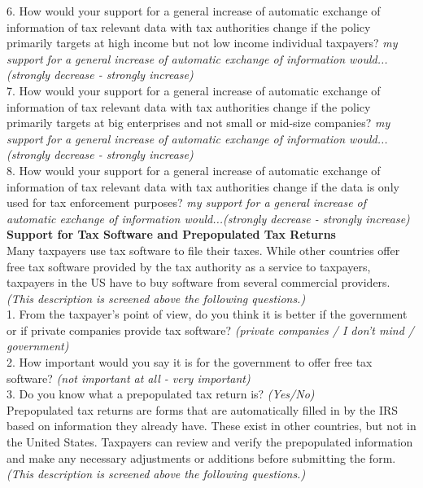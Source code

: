 \documentclass[11pt]{article}
\begin{document}
6. How would your support for a general increase of automatic exchange of information of tax relevant data with tax authorities change if the policy primarily targets at high income but not low income individual taxpayers? \textit{my support for a general increase of automatic exchange of information would...(strongly decrease - strongly increase)} \\[0.5em]
7. How would your support for a general increase of automatic exchange of information of tax relevant data with tax authorities change if the policy primarily targets at big enterprises and not small or mid-size companies? \textit{my support for a general increase of automatic exchange of information would...(strongly decrease - strongly increase)}\\[0.5em]
8. How would your support for a general increase of automatic exchange of information of tax relevant data with tax authorities change if the data is only used for tax enforcement purposes? \textit{my support for a general increase of automatic exchange of information would...(strongly decrease - strongly increase)} \\[1em]
\textbf{Support for Tax Software and Prepopulated Tax Returns} \\[0.5em]
Many taxpayers use tax software to file their taxes. While other countries offer free tax software provided by the tax authority as a service to taxpayers, taxpayers in the US have to buy software from several commercial providers. \textit{(This description is screened above the following questions.)} \\[0.5em] 
1. From the taxpayer's point of view, do you think it is better if the government or if private companies provide tax software? \textit{(private companies / I don't mind / government)} \\[0.5em]
2. How important would you say it is for the government to offer free tax software? \textit{(not important at all - very important)} \\[1em]
3. Do you know what a prepopulated tax return is? \textit{(Yes/No)}\\[1em]
Prepopulated tax returns are forms that are automatically filled in by the IRS based on information they already have. These exist in other countries, but not in the United States. Taxpayers can review and verify the prepopulated information and make any necessary adjustments or additions before submitting the form. \textit{(This description is screened above the following questions.)} \\[0.5em]
\end{document}
